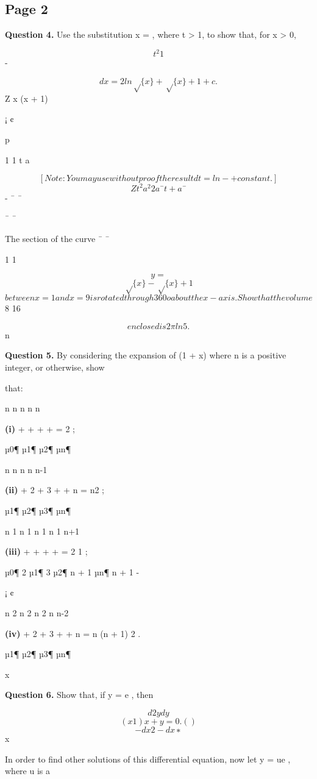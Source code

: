 \documentclass[12pt]{article}
\begin{document}
\subsection*{Page 2}
\begin{flushleft}
\bigskip\textbf{Question 4.} Use the substitution x = , where t > 1, to show that, for x > 0,\par
\[t^2 1\]
-\par
\[dx = 2 ln \sqrt\{x\} + \sqrt\{x\} + 1 + c .\]
Z x (x + 1)\par
¡ ¢\par
p\par
1 1 t a\par
\[[Note: You may use without proof the result dt = ln - + constant. ]\]
\[Z t^2 a^2 2a ¯ t + a ¯\]
- ¯ ¯\par
¯ ¯\par
The section of the curve ¯ ¯\par
1 1\par
\[y =\]
\[\sqrt\{x\} - \sqrt\{x\} + 1\]
\[between x = 1 and x = 9 is rotated through 360 o about the x-axis. Show that the volume\]
8 16\par
\[enclosed is 2\pi ln 5 .\]
n\par
\bigskip\textbf{Question 5.} By considering the expansion of (1 + x) where n is a positive integer, or otherwise, show\par
that:\par
n n n n n\par
\textbf{(i)} + + + + = 2 ;\par
µ0¶ µ1¶ µ2¶ \cdots µn¶\par
n n n n n-1\par
\textbf{(ii)} + 2 + 3 + + n = n2 ;\par
µ1¶ µ2¶ µ3¶ \cdots µn¶\par
n 1 n 1 n 1 n 1 n+1\par
\textbf{(iii)} + + + + = 2 1 ;\par
µ0¶ 2 µ1¶ 3 µ2¶ \cdots n + 1 µn¶ n + 1 -\par
¡ ¢\par
n 2 n 2 n 2 n n-2\par
\textbf{(iv)} + 2 + 3 + + n = n (n + 1) 2 .\par
µ1¶ µ2¶ µ3¶ \cdots µn¶\par
x\par
\bigskip\textbf{Question 6.} Show that, if y = e , then\par
\[d2y dy\]
\[(x 1) x + y = 0 . ( )\]
\[- dx2 - dx ∗\]
x\par
In order to find other solutions of this differential equation, now let y = ue , where u is a\par

\end{flushleft}
\end{document}
